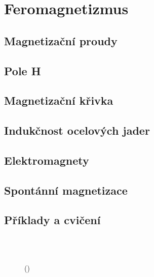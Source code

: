 \setchaptertoc
\chapter{Feromagnetizmus}\label{fyz:IIchapXXXVI}

  \section{Magnetizační proudy}\label{fyz:IIchapXXXVIsecI}
  \section{Pole H}\label{fyz:IIchapXXXVIsecII}
  \section{Magnetizační křivka}\label{fyz:IIchapXXXVIsecIII}
  \section{Indukčnost ocelových jader}\label{fyz:IIchapXXXVIsecIV}
  \section{Elektromagnety}\label{fyz:IIchapXXXVIsecV}
  \section{Spontánní magnetizace}\label{fyz:IIchapXXXVIsecVI}
  \section{Příklady a cvičení}\label{fyz:IIchapXXXVIsecVII}

    \begin{figure}[ht!] %
      \centering
                     \\
                     \\
      \caption{
               (\cite[s.~748]{Feynman02})}
      \label{fyz:fig831}
    \end{figure}


